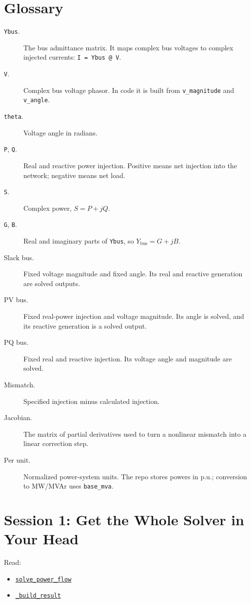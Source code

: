 \documentclass[11pt]{article}
\newcommand{\code}[1]{\texttt{#1}}
\begin{document}
\section{Glossary}

\begin{description}
  \item[\code{Ybus}.] The bus admittance matrix. It maps complex bus voltages
  to complex injected currents: \code{I = Ybus @ V}.
  \item[\code{V}.] Complex bus voltage phasor. In code it is built from
  \code{v\_magnitude} and \code{v\_angle}.
  \item[\code{theta}.] Voltage angle in radians.
  \item[\code{P}, \code{Q}.] Real and reactive power injection. Positive means
  net injection into the network; negative means net load.
  \item[\code{S}.] Complex power, $S = P + jQ$.
  \item[\code{G}, \code{B}.] Real and imaginary parts of \code{Ybus}, so
  $Y_{\mathrm{bus}} = G + jB$.
  \item[Slack bus.] Fixed voltage magnitude and fixed angle. Its real and
  reactive generation are solved outputs.
  \item[PV bus.] Fixed real-power injection and voltage magnitude. Its angle is
  solved, and its reactive generation is a solved output.
  \item[PQ bus.] Fixed real and reactive injection. Its voltage angle and
  magnitude are solved.
  \item[Mismatch.] Specified injection minus calculated injection.
  \item[Jacobian.] The matrix of partial derivatives used to turn a nonlinear
  mismatch into a linear correction step.
  \item[Per unit.] Normalized power-system units. The repo stores powers in
  p.u.; conversion to MW/MVAr uses \code{base\_mva}.
\end{description}

\section{Session 1: Get the Whole Solver in Your Head}

Read:

\begin{itemize}
  \item \href{../src/powerflow/solver.py\#L139}{\code{solve\_power\_flow}}
  \item \href{../src/powerflow/solver.py\#L195}{\code{\_build\_result}}
\end{itemize}
\end{document}
